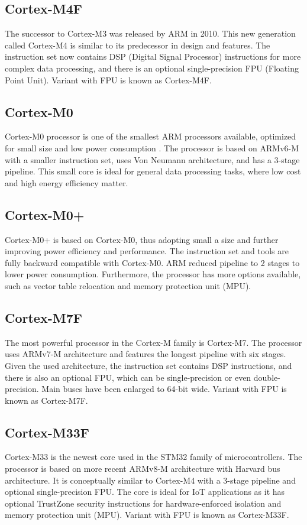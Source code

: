 	\subsection{Cortex-M4F}
	\label{sub:stm_m4}
The successor to Cortex-M3 was released by ARM in 2010. This new generation called Cortex-M4 is similar to its predecessor in design and features. The instruction set now contains DSP (Digital Signal Processor) instructions for more complex data processing, and there is an optional single-precision FPU (Floating Point Unit). Variant with FPU is known as Cortex-M4F. 
	
	\subsection{Cortex-M0}
	\label{sub:stm_m0}		%
Cortex-M0 processor is one of the smallest ARM processors available, optimized for small size and low power consumption \cite{m0_web}. The processor is based on ARMv6-M with a smaller instruction set, uses Von Neumann architecture, and has a 3-stage pipeline. This small core is ideal for general data processing tasks, where low cost and high energy efficiency matter.
	
	\subsection{Cortex-M0+}
	\label{sub:stm_m0_plus}
Cortex-M0+ is based on Cortex-M0, thus adopting small a size and further improving power efficiency and performance. The instruction set and tools are fully backward compatible with Cortex-M0. ARM reduced pipeline to 2 stages to lower power consumption. Furthermore, the processor has more options available, such as vector table relocation and memory protection unit (MPU).
	
	\subsection{Cortex-M7F}
	\label{sub:stm_m7}
The most powerful processor in the Cortex-M family is Cortex-M7. The processor uses ARMv7-M architecture and features the longest pipeline with six stages. Given the used architecture, the instruction set contains DSP instructions, and there is also an optional FPU, which can be single-precision or even double-precision. Main buses have been enlarged to 64-bit wide. Variant with FPU is known as Cortex-M7F. 
	
	\subsection{Cortex-M33F}
	\label{sub:stm_m33}
Cortex-M33 is the newest core used in the STM32 family of microcontrollers. The processor is based on more recent ARMv8-M architecture with Harvard bus architecture. It is conceptually similar to Cortex-M4 with a 3-stage pipeline and optional single-precision FPU. The core is ideal for IoT applications as it has optional TrustZone security instructions for hardware-enforced isolation and memory protection unit (MPU). Variant with FPU is known as Cortex-M33F. 

